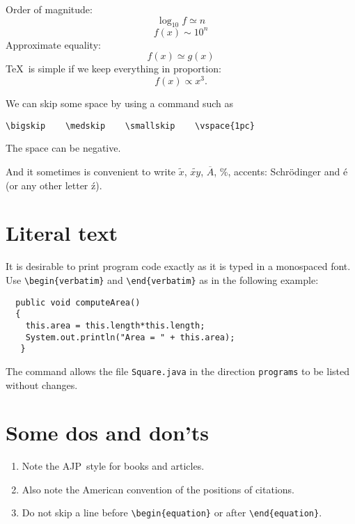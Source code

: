 \documentclass[a4paper,10pt,extramargin]{tubsartcl}
\newcommand{\ajp}{AJP}  %
\begin{document}
\noindent Order of magnitude:
\begin{equation}
\log_{10}f \simeq n
\end{equation}
\begin{equation}
f(x)\sim 10^{n}
\end{equation}
Approximate equality:
\begin{equation}
f(x)\simeq g(x)
\end{equation}
\TeX\ is simple if we keep everything in proportion:
\begin{equation}
f(x) \propto x^3 .
\end{equation}

We can skip some space by using a command such as
\begin{verbatim}
\bigskip    \medskip    \smallskip    \vspace{1pc}
\end{verbatim}
The space can be negative.

And it sometimes is convenient to write $\tilde x$,
$\widetilde{xy}$, $\overline{A}$, \%, accents: Schr\"odinger
and \'e (or any other letter \'z).

\section{Literal text}
It is desirable to print program code exactly as it is typed in a
monospaced font. Use \verb=\begin{verbatim}= and
\verb=\end{verbatim}= as in the following example:
\begin{verbatim}
  public void computeArea()
  {
    this.area = this.length*this.length;
    System.out.println("Area = " + this.area);
   }
\end{verbatim}
The command \verb== allows
the file \texttt{Square.java} in the direction \texttt{programs}
to be listed without changes.

\appendix
\section{Some dos and don'ts}

\begin{enumerate}

\item Note the \ajp\ style for books\cite{latex} and
articles.\cite{1d}

\item Also note the American convention of the positions
of citations.

\item Do not skip a line before \verb=\begin{equation}= or after 
\verb=\end{equation}=.
\end{enumerate}
\end{document}
